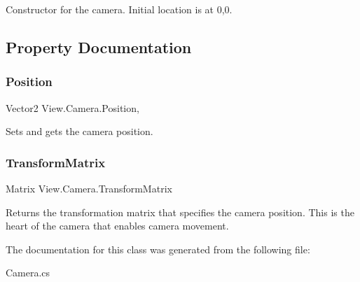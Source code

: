Constructor for the camera. Initial location is at 0,0. 

\subsection{Property Documentation}
\hypertarget{class_view_1_1_camera_aafc05b32a065447351d219867908fd88}{}\label{class_view_1_1_camera_aafc05b32a065447351d219867908fd88} 
\subsubsection{\texorpdfstring{Position}{Position}}
{\footnotesize\ttfamily Vector2 View.\+Camera.\+Position\hspace{0.3cm}{\ttfamily [get]}, {\ttfamily [set]}}

Sets and gets the camera position. \hypertarget{class_view_1_1_camera_a991c3ad145e3f813a9246284f92e3afd}{}\label{class_view_1_1_camera_a991c3ad145e3f813a9246284f92e3afd} 
\subsubsection{\texorpdfstring{Transform\+Matrix}{TransformMatrix}}
{\footnotesize\ttfamily Matrix View.\+Camera.\+Transform\+Matrix\hspace{0.3cm}{\ttfamily [get]}}

Returns the transformation matrix that specifies the camera position. This is the heart of the camera that enables camera movement. 

The documentation for this class was generated from the following file\+:\begin{DoxyCompactItemize}
\item 
Camera.\+cs\end{DoxyCompactItemize}
